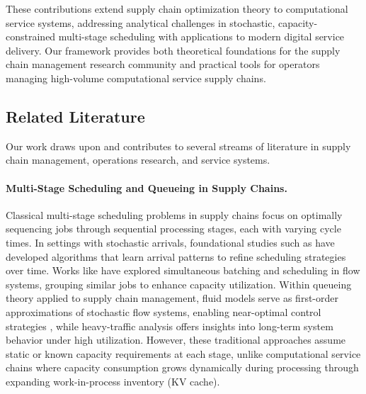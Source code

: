 \documentclass[poms,final,blindrev]{poms1_V1} %
\begin{document}
These contributions extend supply chain optimization theory to computational service systems, addressing analytical challenges in stochastic, capacity-constrained multi-stage scheduling with applications to modern digital service delivery. Our framework provides both theoretical foundations for the supply chain management research community and practical tools for operators managing high-volume computational service supply chains.

\subsection{Related Literature}

Our work draws upon and contributes to several streams of literature in supply chain management, operations research, and service systems.

\paragraph{Multi-Stage Scheduling and Queueing in Supply Chains.} 
Classical multi-stage scheduling problems in supply chains focus on optimally sequencing jobs through sequential processing stages, each with varying cycle times. In settings with stochastic arrivals, foundational studies such as \citet{devanur2009adwords,vee2010optimal,cole2014sample,balkanski2016power,lattanzi2020online} have developed algorithms that learn arrival patterns to refine scheduling strategies over time. Works like \citet{im2013online,lucier2013efficient,liu2015online,li2020online} have explored simultaneous batching and scheduling in flow systems, grouping similar jobs to enhance capacity utilization. Within queueing theory applied to supply chain management, fluid models serve as first-order approximations of stochastic flow systems, enabling near-optimal control strategies \citep{mandelbaum1998strong,maglaras2000discrete,bauerle2002optimal,liu2011network}, while heavy-traffic analysis offers insights into long-term system behavior under high utilization. However, these traditional approaches assume static or known capacity requirements at each stage, unlike computational service chains where capacity consumption grows dynamically during processing through expanding work-in-process inventory (KV cache).
\end{document}
